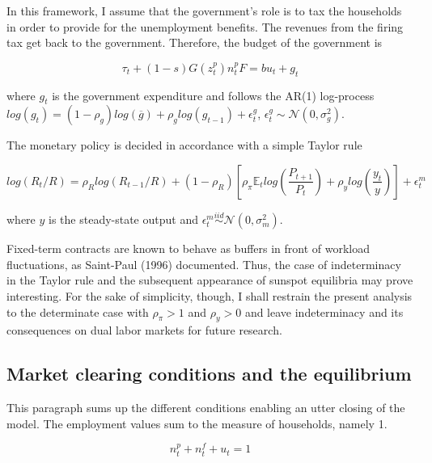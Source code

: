 \documentclass[a4paper]{article}
\begin{document}
In this framework, I assume that the government's role is to tax the households in order to provide for the unemployment benefits. The revenues from the firing tax get back to the government.  Therefore, the budget of the government is

\begin{equation}
\tau_t + (1-s) G\left( z_t^p \right) n_t^p F = b u_t + g_t
\end{equation}

where $g_t$ is the government expenditure and follows the AR(1) log-process $log\left(g_t\right) = \left(1-\rho_g\right) log\left(\overline{g}\right) + \rho_g log\left( g_{t-1} \right) + \epsilon_t^g$, $\epsilon_t^g \sim \mathcal{N} \left( 0, \sigma_g^2 \right)$.

The monetary policy is decided in accordance with a simple Taylor rule

\begin{equation}
log\left( R_{t} / R \right) = \rho_R log\left( R_{t-1} / R\right) + \left( 1 - \rho_R \right) \left[ \rho_{\pi} \mathbb{E}_t log \left( \frac{P_{t+1}}{P_t} \right) + \rho_y log\left(\frac{y_t}{y}\right) \right] + \epsilon_t^m \label{taylor}
\end{equation}

where $y$ is the steady-state output and $\epsilon_t^m \overset{iid}{\sim} \mathcal{N} \left( 0, \sigma_m^2 \right)$.

Fixed-term contracts are known to behave as buffers in front of workload fluctuations, as Saint-Paul (1996) \cite{saint1996dual} documented. Thus, the case of indeterminacy in the Taylor rule and the subsequent appearance of sunspot equilibria may prove interesting. For the sake of simplicity, though, I shall restrain the present analysis to the determinate case with $\rho_{\pi} > 1$ and $\rho_y > 0$ and leave indeterminacy and its consequences on dual labor markets for future research.

\subsection{Market clearing conditions and the equilibrium}

This paragraph sums up the different conditions enabling an utter closing of the model. The employment values sum to the measure of households, namely 1.

\begin{equation}
n_t^p + n_t^f + u_t = 1
\end{equation}
\end{document}
